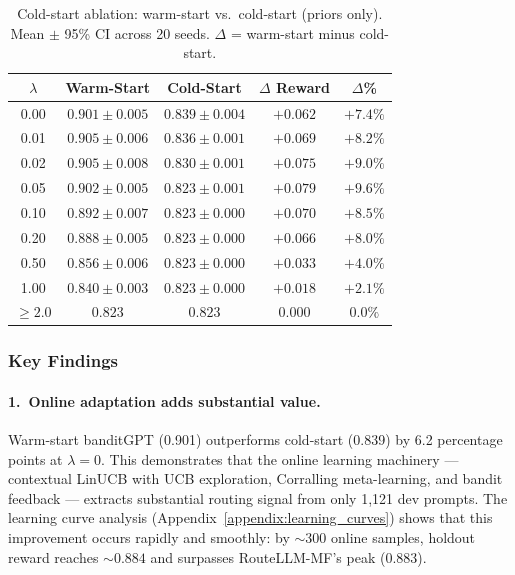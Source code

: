 \begin{table}[h]
\centering
\caption{Cold-start ablation: warm-start vs.\ cold-start (priors only).
Mean $\pm$ 95\% CI across 20 seeds.  $\Delta$ = warm-start minus cold-start.}
\label{tab:cold_start}
\small
\begin{tabular}{@{}ccccc@{}}
\toprule
$\lambda$ & \textbf{Warm-Start} & \textbf{Cold-Start} & \textbf{$\Delta$ Reward} & \textbf{$\Delta$\%} \\
\midrule
0.00 & $0.901 \pm 0.005$ & $0.839 \pm 0.004$ & $+0.062$ & $+7.4\%$ \\
0.01 & $0.905 \pm 0.006$ & $0.836 \pm 0.001$ & $+0.069$ & $+8.2\%$ \\
0.02 & $0.905 \pm 0.008$ & $0.830 \pm 0.001$ & $+0.075$ & $+9.0\%$ \\
0.05 & $0.902 \pm 0.005$ & $0.823 \pm 0.001$ & $+0.079$ & $+9.6\%$ \\
0.10 & $0.892 \pm 0.007$ & $0.823 \pm 0.000$ & $+0.070$ & $+8.5\%$ \\
0.20 & $0.888 \pm 0.005$ & $0.823 \pm 0.000$ & $+0.066$ & $+8.0\%$ \\
0.50 & $0.856 \pm 0.006$ & $0.823 \pm 0.000$ & $+0.033$ & $+4.0\%$ \\
1.00 & $0.840 \pm 0.003$ & $0.823 \pm 0.000$ & $+0.018$ & $+2.1\%$ \\
$\geq 2.0$ & $0.823$ & $0.823$ & $0.000$ & $0.0\%$ \\
\bottomrule
\end{tabular}
\end{table}

\subsubsection{Key Findings}

\paragraph{1.\ Online adaptation adds substantial value.}
Warm-start banditGPT (0.901) outperforms cold-start (0.839) by 6.2
percentage points at $\lambda{=}0$.  This demonstrates that the online
learning machinery --- contextual LinUCB with UCB exploration, Corralling
meta-learning, and bandit feedback --- extracts substantial routing signal
from only 1,121 dev prompts.  The learning curve analysis
(Appendix~\ref{appendix:learning_curves}) shows that this improvement
occurs rapidly and smoothly: by ${\sim}300$ online samples, holdout reward
reaches ${\sim}0.884$ and surpasses RouteLLM-MF's peak (0.883).


